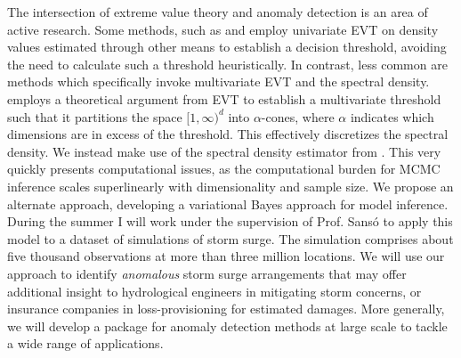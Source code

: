 \documentclass{article}
\begin{document}
The intersection of extreme value theory and anomaly detection is an area of active
    research.  Some methods, such as \cite{clifton2011} and \cite{gu2021} employ univariate
    EVT on density values estimated through other means to establish a decision threshold, 
    avoiding the need to calculate such a threshold heuristically. In contrast, less 
    common are methods which specifically invoke multivariate EVT and the 
    spectral density.  \cite{goix2017} employs a theoretical argument from EVT to establish 
    a multivariate threshold such that it partitions the space $[1,\infty)^d$ into 
    $\alpha$-cones, where $\alpha$ indicates which dimensions are in excess of the threshold.  
    This effectively discretizes the spectral density.  We instead make use of the
    spectral density estimator from \cite{trubey:pg}.  This very quickly presents 
    computational issues, as the computational burden for MCMC inference scales 
    superlinearly with dimensionality and sample size. We propose an alternate approach, 
    developing a variational Bayes approach for model inference.  During the summer I will
    work under the supervision of Prof. Sans\'o to  apply this model to a  dataset of simulations 
    of storm surge. The simulation comprises  about five thousand observations at more than 
    three million locations.  We will use our approach to identify \emph{anomalous} storm surge 
    arrangements that may offer additional insight  to hydrological engineers in mitigating 
    storm concerns, or insurance companies in  loss-provisioning for estimated damages.  
    More generally, we will develop a package for anomaly detection methods at large scale 
    to tackle a wide range of applications.

\end{document}

